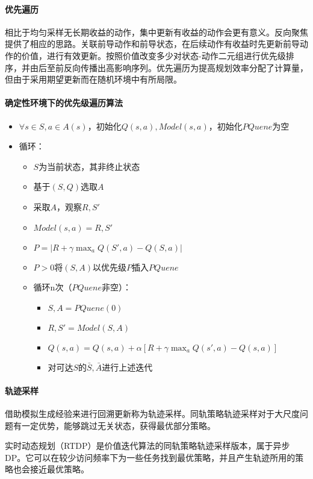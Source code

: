 \documentclass[
12pt, %
a4paper, 
oneside, %
headinclude,footinclude, %
]{scrartcl}
\begin{document}
\paragraph{优先遍历}
相比于均匀采样无长期收益的动作，集中更新有收益的动作会更有意义。反向聚焦提供了相应的思路。关联前导动作和前导状态，在后续动作有收益时先更新前导动作的价值，进行有效更新。按照价值改变多少对状态-动作二元组进行优先级排序，并由后至前反向传播出高影响序列。优先遍历为提高规划效率分配了计算量，但由于采用期望更新而在随机环境中有所局限。
\paragraph{确定性环境下的优先级遍历算法}
\begin{itemize}
\item $ \forall s \in S, a \in A(s) $，初始化$ Q(s, a),Model(s, a) $，初始化$ PQuene $为空
\item 循环：
\begin{itemize}
\item $ S $为当前状态，其非终止状态
\item 基于$ (S,Q) $选取$ A $
\item 采取$ A $，观察$ R,S' $
\item $ Model(s, a) = R,S' $
\item $ P = |R + \gamma \max_a Q(S',a) - Q(S,a)| $
\item $ P > 0 $将$ (S,A) $以优先级$ P $插入$ PQuene $
\item 循环n次（$ PQuene $非空）：
\begin{itemize}
\item $ S,A = PQuene(0) $ 
\item $ R,S' = Model(S, A) $
\item $ Q(s, a) = Q(s, a) + \alpha[R + \gamma \max_aQ(s', a) - Q(s, a)] $
\item 对可达$ S $的$ \bar{S},\bar{A} $进行上述迭代
\end{itemize}
\end{itemize}
\end{itemize}
\paragraph{轨迹采样}
借助模拟生成经验来进行回溯更新称为轨迹采样。同轨策略轨迹采样对于大尺度问题有一定优势，能够跳过无关状态，获得最优部分策略。

实时动态规划（RTDP）是价值迭代算法的同轨策略轨迹采样版本，属于异步DP。它可以在较少访问频率下为一些任务找到最优策略，并且产生轨迹所用的策略也会接近最优策略。
\end{document}
